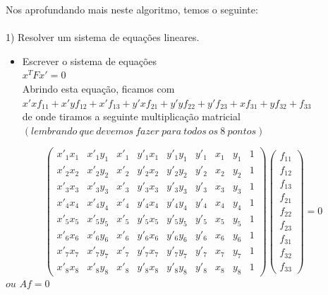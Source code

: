 \documentclass[conference]{IEEEtran}
\begin{document}
 Nos aprofundando mais neste algoritmo, temos o seguinte:
 \\
 \\
 1) Resolver um sistema de equa\c{c}\~oes lineares.
	  \begin{itemize}
	   \item Escrever o sistema de equa\c{c}\~oes 
		  \\
		  \centering $x^{T}Fx'=0$ 
		  \\
		  Abrindo esta equa\c{c}\~ao, ficamos com
		  \\
		  \centering
		  $x'xf_{11}+x'yf_{12}+x'f_{13}+y'xf_{21}+y'yf_{22}+y'f_{23}+xf_{31}+yf_{32}+f_{33}$
		  \\
		  de onde tiramos a seguinte multiplica\c{c}\~ao matricial $(lembrando\> que\> devemos\> fazer\> para\> 
		  todos\> os\> 8\> pontos)$
		  
	  \end{itemize}
\footnotesize 
\[ \left( \begin{array}{ccccccccc}
x'_{1}x_{1} & x'_{1}y_{1} & x'_{1} & y'_{1}x_{1} & y'_{1}y_{1} & y'_{1} & x_{1} & y_{1} & 1 \\
x'_{2}x_{2} & x'_{2}y_{2} & x'_{2} & y'_{2}x_{2} & y'_{2}y_{2} & y'_{2} & x_{2} & y_{2} & 1 \\
x'_{3}x_{3} & x'_{3}y_{3} & x'_{3} & y'_{3}x_{3} & y'_{3}y_{3} & y'_{3} & x_{3} & y_{3} & 1 \\
x'_{4}x_{4} & x'_{4}y_{4} & x'_{4} & y'_{4}x_{4} & y'_{4}y_{4} & y'_{4} & x_{4} & y_{4} & 1 \\
x'_{5}x_{5} & x'_{5}y_{5} & x'_{5} & y'_{5}x_{5} & y'_{5}y_{5} & y'_{5} & x_{5} & y_{5} & 1 \\
x'_{6}x_{6} & x'_{6}y_{6} & x'_{6} & y'_{6}x_{6} & y'_{6}y_{6} & y'_{6} & x_{6} & y_{6} & 1 \\
x'_{7}x_{7} & x'_{7}y_{7} & x'_{7} & y'_{7}x_{7} & y'_{7}y_{7} & y'_{7} & x_{7} & y_{7} & 1 \\
x'_{8}x_{8} & x'_{8}y_{8} & x'_{8} & y'_{8}x_{8} & y'_{8}y_{8} & y'_{8} & x_{8} & y_{8} & 1 
\end{array} \right)
\left( \begin{array}{c}
f_{11} \\
f_{12} \\
f_{13} \\
f_{21} \\
f_{22} \\
f_{23} \\
f_{31} \\
f_{32} \\
f_{33}
\end{array} \right)
= 0
\]
\normalsize
\tab $ou$
\tab $Af = 0$
\end{document}
